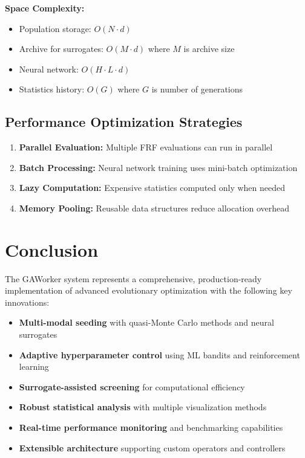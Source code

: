 \documentclass[12pt,a4paper]{article}
\begin{document}
\textbf{Space Complexity:}
\begin{itemize}
\item Population storage: $O(N \cdot d)$
\item Archive for surrogates: $O(M \cdot d)$ where $M$ is archive size
\item Neural network: $O(H \cdot L \cdot d)$
\item Statistics history: $O(G)$ where $G$ is number of generations
\end{itemize}

\subsection{Performance Optimization Strategies}
\begin{enumerate}
\item \textbf{Parallel Evaluation:} Multiple FRF evaluations can run in parallel
\item \textbf{Batch Processing:} Neural network training uses mini-batch optimization
\item \textbf{Lazy Computation:} Expensive statistics computed only when needed
\item \textbf{Memory Pooling:} Reusable data structures reduce allocation overhead
\end{enumerate}

\section{Conclusion}

The GAWorker system represents a comprehensive, production-ready implementation of advanced evolutionary optimization with the following key innovations:

\begin{itemize}
\item \textbf{Multi-modal seeding} with quasi-Monte Carlo methods and neural surrogates
\item \textbf{Adaptive hyperparameter control} using ML bandits and reinforcement learning
\item \textbf{Surrogate-assisted screening} for computational efficiency
\item \textbf{Robust statistical analysis} with multiple visualization methods
\item \textbf{Real-time performance monitoring} and benchmarking capabilities
\item \textbf{Extensible architecture} supporting custom operators and controllers
\end{itemize}
\end{document}

